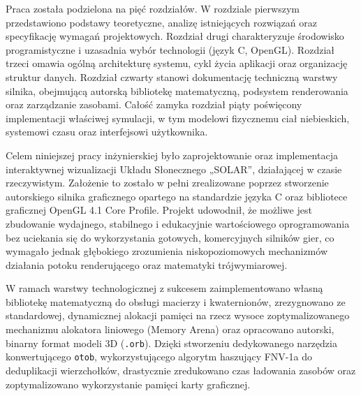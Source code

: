 \documentclass[xodstep]{wnspt}
\newcommand{\file}[1]{\texttt{#1}}
\newcommand{\var}[1]{\lstinline|#1|}
\begin{document}
Praca została podzielona na pięć rozdziałów. W rozdziale pierwszym przedstawiono podstawy teoretyczne, analizę istniejących rozwiązań oraz specyfikację wymagań projektowych. Rozdział drugi charakteryzuje środowisko programistyczne i uzasadnia wybór technologii (język C, OpenGL). Rozdział trzeci omawia ogólną architekturę systemu, cykl życia aplikacji oraz organizację struktur danych. Rozdział czwarty stanowi dokumentację techniczną warstwy silnika, obejmującą autorską bibliotekę matematyczną, podsystem renderowania oraz zarządzanie zasobami. Całość zamyka rozdział piąty poświęcony implementacji właściwej symulacji, w tym modelowi fizycznemu ciał niebieskich, systemowi czasu oraz interfejsowi użytkownika.








\summary
Celem niniejszej pracy inżynierskiej było zaprojektowanie oraz implementacja interaktywnej wizualizacji Układu Słonecznego „SOLAR”, działającej w czasie rzeczywistym. Założenie to zostało w pełni zrealizowane poprzez stworzenie autorskiego silnika graficznego opartego na standardzie języka C oraz bibliotece graficznej OpenGL 4.1 Core Profile. Projekt udowodnił, że możliwe jest zbudowanie wydajnego, stabilnego i edukacyjnie wartościowego oprogramowania bez uciekania się do wykorzystania gotowych, komercyjnych silników gier, co wymagało jednak głębokiego zrozumienia niskopoziomowych mechanizmów działania potoku renderującego oraz matematyki trójwymiarowej.

W ramach warstwy technologicznej z sukcesem zaimplementowano własną bibliotekę matematyczną do obsługi macierzy i kwaternionów, zrezygnowano ze standardowej, dynamicznej alokacji pamięci na rzecz wysoce zoptymalizowanego mechanizmu alokatora liniowego (Memory Arena) oraz opracowano autorski, binarny format modeli 3D (\file{.orb}). Dzięki stworzeniu dedykowanego narzędzia konwertującego \var{otob}, wykorzystującego algorytm haszujący FNV-1a do deduplikacji wierzchołków, drastycznie zredukowano czas ładowania zasobów oraz zoptymalizowano wykorzystanie pamięci karty graficznej.
\end{document}
